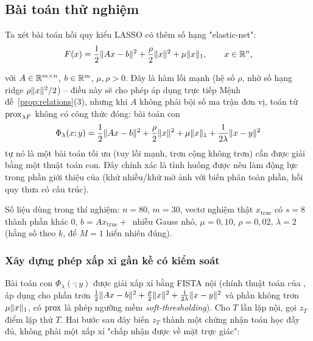 \begin{essayonly}
\subsection*{Bài toán thử nghiệm}
Ta xét bài toán hồi quy kiểu LASSO có thêm số hạng "elastic-net":
\begin{equation}
  F(x) = \frac12\lVert Ax-b\rVert^2 + \frac\rho2\lVert x\rVert^2 + \mu\lVert x\rVert_1,
  \qquad x\in\mathbb{R}^n,
  \label{eq:elasticnet}
\end{equation}

với $A\in\mathbb{R}^{m\times n}$, $b\in\mathbb{R}^m$, $\mu,\rho>0$. Đây là hàm lồi {mạnh} (hệ số $\rho$, nhờ số hạng ridge $\rho\lVert x\rVert^2/2$) -- điều này sẽ cho phép áp dụng trực tiếp Mệnh đề~\ref{prop:relations}(3),
nhưng khi $A$ không phải bội số ma trận đơn vị, toán tử $\operatorname{prox}_{\lambda F}$ {không có công thức đóng}: bài toán con
\[
  \Phi_\lambda(x;y) = \frac12\lVert Ax-b\rVert^2+\frac\rho2\lVert x\rVert^2
  +\mu\lVert x\rVert_1+\frac1{2\lambda}\lVert x-y\rVert^2
\]
tự nó là một bài toán tối ưu (tuy lồi mạnh, trơn cộng không trơn) cần được giải bằng một thuật toán con. Đây chính xác là tình huống được nêu
làm động lực trong phần giới thiệu của \citet{salzovilla2012} (khử nhiễu/khử mờ ảnh với biến phân toàn phần, hồi quy thưa có cấu trúc).

Số liệu dùng trong thí nghiệm: $n=80$, $m=30$, vectơ nghiệm thật $x_{\text{true}}$ có $s=8$ thành phần khác 0, $b=Ax_{\text{true}}+$~nhiễu Gauss nhỏ, $\mu=0{,}10$, $\rho=0{,}02$, $\lambda=2$ (hằng số theo $k$, để $M=1$ hiển nhiên đúng).

\subsubsection*{Xây dựng phép xấp xỉ gần kề có kiểm soát}\label{sec:numerical-construction}

Bài toán con $\Phi_\lambda(\cdot;y)$ được giải xấp xỉ bằng
{FISTA nội} (chính thuật toán của \citealp{beck2009fista}, áp
dụng cho phần trơn $\tfrac12\lVert Ax-b\rVert^2+\tfrac\rho2\lVert x\rVert^2+\tfrac1{2\lambda}\lVert x-y\rVert^2$
và phần không trơn $\mu\lVert x\rVert_1$, có $\operatorname{prox}$ là phép ngưỡng mềm
\emph{soft-thresholding}). Cho $T$ lần lặp nội, gọi $z_T$ điểm lặp thứ
$T$. Hai bước sau đây biến $z_T$ thành một {chứng nhận toán học
đầy đủ}, không phải một xấp xỉ "chấp nhận được về mặt trực giác":


\end{essayonly}
